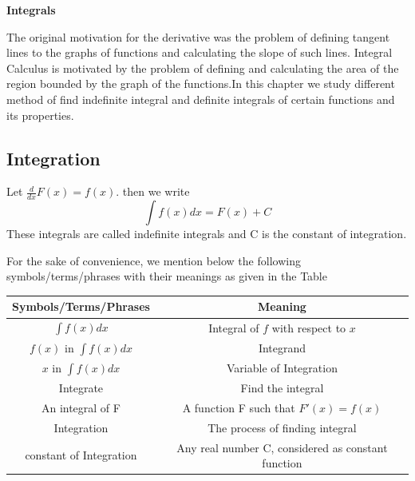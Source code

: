 \documentclass[12pt]{article}
\begin{document}
\begin{center}
    {\LARGE \textbf{Integrals} }
\end{center}



The original motivation for the derivative was
the problem of defining tangent lines to the graphs of
functions and calculating the slope of such lines. Integral
Calculus is motivated by the problem of defining and
calculating the area of the region bounded by the graph of
the functions.In this chapter we study different method of find indefinite integral and definite integrals of certain functions and its properties.

\subsection*{Integration}
Let $\frac{d}{dx}F(x)=f(x)$. then we write $$\int f(x) dx=F(x)+C$$  These integrals are called indefinite integrals and C is the constant of integration.


For the sake of convenience, we mention below the following symbols/terms/phrases
with their meanings as given in the Table

\begin{center}

\begingroup\setlength{\fboxsep}{0pt}
\colorbox{tablecolor}{%

    \begin{tabular}{ |c|c| } 
    \hline 
     \textbf{Symbols/Terms/Phrases} & \textbf{Meaning}  \\ [2.5ex]
    \hline \hline
     $\int f(x) dx$ & Integral of $f$ with respect to $x$ \\ 
     \hline
     $f(x)$ in $\int f(x) dx$ & Integrand \\ 
    \hline
    $x$ in $\int f(x) dx$ & Variable of Integration \\
    \hline
    Integrate & Find the integral \\
    \hline
    An integral of F & A function F such that $F'(x)=f(x)$ \\
    \hline
    Integration & The process of finding integral \\
    \hline
    constant of Integration & Any real number C, considered as
    constant function \\
    \hline

    \end{tabular}%
}\endgroup




    \end{center}
\end{document}
